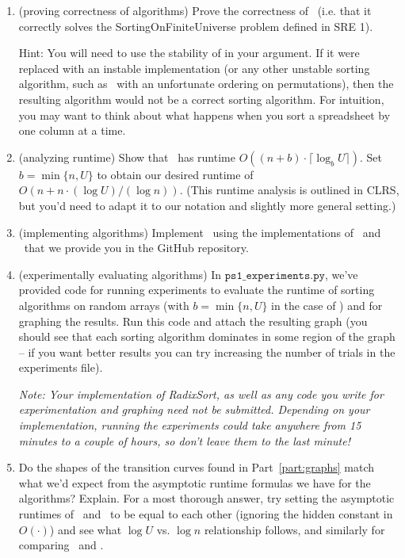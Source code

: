 \documentclass[11pt]{article}
\begin{document}
\begin{enumerate}
        \begin{enumerate}
        
            \item (proving correctness of algorithms) Prove the correctness of \RadixSort\ (i.e. that it correctly solves the SortingOnFiniteUniverse problem defined in SRE 1). 
            
            Hint: You will need to use the stability of \SingletonBucketSort in your argument. If it were replaced with an instable implementation (or any other unstable sorting algorithm, such as \ExhaustiveSearchSort\ with an unfortunate ordering on permutations), then the resulting algorithm would not be a correct sorting algorithm.   For intuition, you may want to think about what happens when you sort a spreadsheet by one column at a time. 
            
            \item (analyzing runtime) Show that \RadixSort\ has runtime $O((n+b)\cdot \lceil \log_b U\rceil)$.  Set $b=\min\{n,U\}$ to obtain our desired runtime of $O(n+n\cdot (\log U)/(\log n))$.  (This runtime analysis is outlined in CLRS, but you'd need to adapt it to our notation and slightly more general setting.) 
            
            \item (implementing algorithms)
            Implement \RadixSort\ using the implementations of \SingletonBucketSort\ and \BC\ that we provide you in the GitHub repository. 
  
            \item (experimentally evaluating algorithms) \label{part:graphs}
            In $\texttt{ps1\_experiments.py}$, we've provided code for running experiments to evaluate the runtime of sorting algorithms on random arrays (with $b=\min\{n,U\}$ in the case of \RadixSort) and for graphing the results. Run this code and attach the resulting graph (you should see that each sorting algorithm dominates in some region of the graph -- if you want better results you can try increasing the number of trials in the experiments file).
                
            \textit{Note: Your implementation of RadixSort, as well as any code you write for experimentation and graphing need not be submitted. Depending on your implementation, running the experiments could take anywhere from 15 minutes to a couple of hours, so don't leave them to the last minute!}   
            
            \item Do the shapes of the transition curves found in Part~\ref{part:graphs} match what we'd expect from the asymptotic runtime formulas we have for the algorithms?  Explain.
            For a most thorough answer, try setting the asymptotic runtimes of \SingletonBucketSort\ and \RadixSort\ to be equal to each other (ignoring the hidden constant in $O(\cdot)$) and see what $\log U$ vs. $\log n$ relationship follows, and similarly for comparing \RadixSort\ and \MergeSort.


\end{enumerate}
\end{enumerate}
\end{document}
